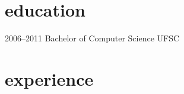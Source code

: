 \documentclass[]{friggeri-cv} %
\begin{document}

\section{education}

\begin{entrylist}
\entry
{2006--2011}
{Bachelor of Computer Science}
{UFSC}
{}
\end{entrylist}


\section{experience}
\end{document}

